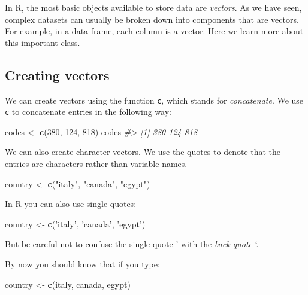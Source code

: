 \documentclass[
]{krantz}
\newenvironment{Shaded}{\begin{snugshade}}{\end{snugshade}}
\newcommand{\CommentTok}[1]{\textcolor[rgb]{0.37,0.37,0.37}{\textit{#1}}}
\newcommand{\DecValTok}[1]{\textcolor[rgb]{0.06,0.06,0.06}{#1}}
\newcommand{\KeywordTok}[1]{\textcolor[rgb]{0.27,0.27,0.27}{\textbf{#1}}}
\newcommand{\NormalTok}[1]{#1}
\newcommand{\StringTok}[1]{\textcolor[rgb]{0.5,0.5,0.5}{#1}}
\begin{document}
In R, the most basic objects available to store data are \emph{vectors}. As we have seen, complex datasets can usually be broken down into components that are vectors. For example, in a data frame, each column is a vector. Here we learn more about this important class.

\hypertarget{creating-vectors}{%
\subsection{Creating vectors}\label{creating-vectors}}

We can create vectors using the function \texttt{c}, which stands for \emph{concatenate}. We use \texttt{c} to concatenate entries in the following way:

\begin{Shaded}
\begin{Highlighting}[]
\NormalTok{codes <-}\StringTok{ }\KeywordTok{c}\NormalTok{(}\DecValTok{380}\NormalTok{, }\DecValTok{124}\NormalTok{, }\DecValTok{818}\NormalTok{)}
\NormalTok{codes}
\CommentTok{#> [1] 380 124 818}
\end{Highlighting}
\end{Shaded}

We can also create character vectors. We use the quotes to denote that the entries are characters rather than variable names.

\begin{Shaded}
\begin{Highlighting}[]
\NormalTok{country <-}\StringTok{ }\KeywordTok{c}\NormalTok{(}\StringTok{"italy"}\NormalTok{, }\StringTok{"canada"}\NormalTok{, }\StringTok{"egypt"}\NormalTok{)}
\end{Highlighting}
\end{Shaded}

In R you can also use single quotes:

\begin{Shaded}
\begin{Highlighting}[]
\NormalTok{country <-}\StringTok{ }\KeywordTok{c}\NormalTok{(}\StringTok{'italy'}\NormalTok{, }\StringTok{'canada'}\NormalTok{, }\StringTok{'egypt'}\NormalTok{)}
\end{Highlighting}
\end{Shaded}

But be careful not to confuse the single quote ' with the \emph{back quote} `.

By now you should know that if you type:

\begin{Shaded}
\begin{Highlighting}[]
\NormalTok{country <-}\StringTok{ }\KeywordTok{c}\NormalTok{(italy, canada, egypt)}
\end{Highlighting}
\end{Shaded}
\end{document}

